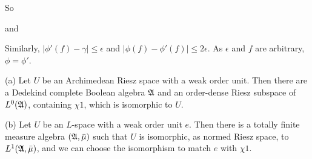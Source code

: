 {


\noindent So


\noindent and



\noindent Similarly, $|\phi'(f)-\gamma|\le\epsilon$ and
$|\phi(f)-\phi'(f)|\le 2\epsilon$.   As $\epsilon$ and $f$ are arbitrary,
$\phi=\phi'$.
}%

 (a) Let $U$ be an Archimedean Riesz space
with a weak order unit.
Then there are a Dedekind complete Boolean algebra
$\frak A$ and an order-dense Riesz subspace of $L^0(\frak A)$, containing
$\chi 1$, which is isomorphic to $U$.

(b) Let $U$ be an $L$-space with a weak order unit $e$.   Then there is a
totally finite measure algebra $(\frak A,\bar\mu)$ such that $U$ is
isomorphic, as normed Riesz space, to $L^1(\frak A,\bar\mu)$, and we can
choose the isomorphism to match $e$ with $\chi 1$.

